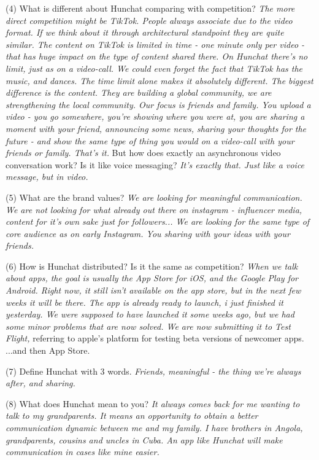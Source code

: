 \documentclass[11pt]{article}
\begin{document}
(4) What is different about Hunchat comparing with competition? \textit{The more direct competition might be TikTok. People always associate due to the video format. If we think about it through architectural standpoint they are quite similar. The content on TikTok is limited in time - one minute only per video - that has huge impact on the type of content shared there. On Hunchat there's no limit, just as on a video-call. We could even forget the fact that TikTok has the music, and dances. The time limit alone makes it absolutely different. The biggest difference is the content. They are building a global community, we are strengthening the local community. Our focus is friends and family. You upload a video - you go somewhere, you're showing where you were at,  you are sharing a moment with your friend, announcing some news, sharing your thoughts for the future - and show the same type of thing you would on a video-call with your friends or family. That's it.} But how does exactly an asynchronous video conversation work? Is it like voice messaging? \textit{It's exactly that. Just like a voice message, but in video.}

(5) What are the brand values? \textit{We are looking for meaningful communication. We are not looking for what already out there on instagram - influencer media, content for it's own sake just for followers... We are looking for the same type of core audience as on early Instagram. You sharing with your ideas with your friends.}

(6) How is Hunchat distributed? Is it the same as competition? \textit{When we talk about apps, the goal is usually the App Store for iOS, and the Google Play for Android. Right now, it still isn't available on the app store, but in the next few weeks it will be there. The app is already ready to launch, i just finished it yesterday. We were supposed to have launched it some weeks ago, but we had some minor problems that are now solved. We are now submitting it to Test Flight,} referring to apple's platform for testing beta versions of newcomer apps. {...and then App Store.}

(7) Define Hunchat with 3 words.  \textit{Friends, meaningful - the thing we're always after, and sharing.}

(8) What does Hunchat mean to you? \textit{It always comes back for me wanting to talk to my grandparents. It means an opportunity to obtain a better communication dynamic between me and my family. I have brothers in Angola, grandparents, cousins and uncles in Cuba. An app like Hunchat will make communication in cases like mine easier. }
\end{document}

